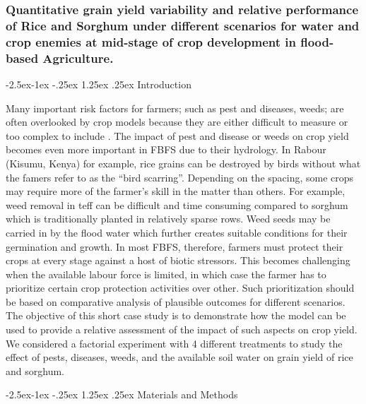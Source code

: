 \documentclass[12pt,oneside]{article}
\makeatletter
\renewcommand\paragraph{\@startsection{paragraph}{4}{\z@}%
            {-2.5ex\@plus -1ex \@minus -.25ex}%
            {1.25ex \@plus .25ex}%
            {\normalfont\normalsize\bfseries}}
\makeatother
\begin{document}
\hypertarget{IV23}{%
\subsubsection{Quantitative grain yield variability and relative performance of Rice and Sorghum under different scenarios for water and crop enemies at mid-stage of crop development in flood-based Agriculture.}\label{IV23}}

\hypertarget{IV231}{%
\paragraph{Introduction}\label{IV231}}

Many important risk factors for farmers; such as pest and diseases, weeds; are often overlooked by crop models because they are either difficult to measure or too complex to include . The impact of pest and disease or weeds on crop yield becomes even more important in FBFS due to their hydrology. In Rabour (Kisumu, Kenya) for example, rice grains can be destroyed by birds without what the famers refer to as the ``bird scarring''. Depending on the spacing, some crops may require more of the farmer's skill in the matter than others. For example, weed removal in teff can be difficult and time consuming compared to sorghum which is traditionally planted in relatively sparse rows. Weed seeds may be carried in by the flood water which further creates suitable conditions for their germination and growth. In most FBFS, therefore, farmers must protect their crops at every stage against a host of biotic stressors. This becomes challenging when the available labour force is limited, in which case the farmer has to prioritize certain crop protection activities over other. Such prioritization should be based on comparative analysis of plausible outcomes for different scenarios. The objective of this short case study is to demonstrate how the model can be used to provide a relative assessment of the impact of such aspects on crop yield. We considered a factorial experiment with 4 different treatments to study the effect of pests, diseases, weeds, and the available soil water on grain yield of rice and sorghum.

\hypertarget{IV232}{%
\paragraph{Materials and Methods}\label{IV232}}
\end{document}
